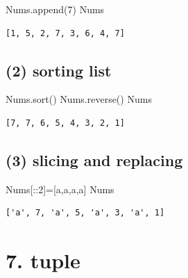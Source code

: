 \documentclass[
  letterpaper,
  DIV=11,
  numbers=noendperiod]{scrreprt}
\newenvironment{Shaded}{\begin{snugshade}}{\end{snugshade}}
\newcommand{\DecValTok}[1]{\textcolor[rgb]{0.68,0.00,0.00}{#1}}
\newcommand{\NormalTok}[1]{\textcolor[rgb]{0.00,0.23,0.31}{#1}}
\newcommand{\OperatorTok}[1]{\textcolor[rgb]{0.37,0.37,0.37}{#1}}
\newcommand{\StringTok}[1]{\textcolor[rgb]{0.13,0.47,0.30}{#1}}
\begin{document}
\begin{Shaded}
\begin{Highlighting}[]
\NormalTok{Nums.append(}\DecValTok{7}\NormalTok{)}
\NormalTok{Nums}
\end{Highlighting}
\end{Shaded}

\begin{verbatim}
[1, 5, 2, 7, 3, 6, 4, 7]
\end{verbatim}

\subsection*{(2) sorting list}\label{sorting-list}

\begin{Shaded}
\begin{Highlighting}[]
\NormalTok{Nums.sort()}
\NormalTok{Nums.reverse()}
\NormalTok{Nums}
\end{Highlighting}
\end{Shaded}

\begin{verbatim}
[7, 7, 6, 5, 4, 3, 2, 1]
\end{verbatim}

\subsection*{(3) slicing and replacing}\label{slicing-and-replacing}

\begin{Shaded}
\begin{Highlighting}[]
\NormalTok{Nums[::}\DecValTok{2}\NormalTok{]}\OperatorTok{=}\NormalTok{[}\StringTok{\textquotesingle{}a\textquotesingle{}}\NormalTok{,}\StringTok{\textquotesingle{}a\textquotesingle{}}\NormalTok{,}\StringTok{\textquotesingle{}a\textquotesingle{}}\NormalTok{,}\StringTok{\textquotesingle{}a\textquotesingle{}}\NormalTok{]}
\NormalTok{Nums}
\end{Highlighting}
\end{Shaded}

\begin{verbatim}
['a', 7, 'a', 5, 'a', 3, 'a', 1]
\end{verbatim}

\section*{7. tuple}\label{tuple}
\end{document}
